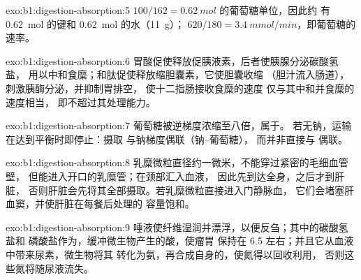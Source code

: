 \begin{solution}{exo:b1:digestion-absorption:5}
$100/162 = \qty{0.62}{mol}$ 的葡萄糖单位，因此约
有 \qty{0.62}{mol} 的键和 \qty{0.62}{mol} 的水（\qty{11}{g}）；
$620/180 = \qty{3.4}{mmol/min}$，即葡萄糖的速率。
\end{solution}

\begin{solution}{exo:b1:digestion-absorption:6}
胃酸促使释放促胰液素，后者使胰腺分泌碳酸氢盐，
用以中和食糜；和肽促使释放缩胆囊素，它使胆囊收缩
（胆汁流入肠道），刺激胰酶分泌，并抑制胃排空，
使十二指肠接收食糜的速度
仅与其中和并食糜的速度相当，
即不超过其处理能力。
\end{solution}

\begin{solution}{exo:b1:digestion-absorption:7}
葡萄糖被逆梯度浓缩至八倍，属于。
若无钠，运输在达到平衡时即停止：摄取
与钠梯度偶联（钠–葡萄糖），
而并非直接与  偶联。
\end{solution}

\begin{solution}{exo:b1:digestion-absorption:8}
乳糜微粒直径约一微米，不能穿过紧密的毛细血管壁，
但能进入开口的乳糜管；在颈部汇入血液，
因此先到达全身，之后才到肝脏，
否则肝脏会先将其全部摄取。若乳糜微粒直接进入门静脉血，
它们会堵塞肝血窦，并使肝脏在每餐后处理的
容量饱和。
\end{solution}

\begin{solution}{exo:b1:digestion-absorption:9}
唾液使纤维湿润并漂浮，以便反刍；其中的碳酸氢盐和
磷酸盐作为，缓冲微生物产生的酸，使瘤胃
保持在  6.5 左右；并且它从血液中带来尿素，微生物将其
转化为氨，再合成自身的，使氮得以回收利用，
否则这些氮将随尿液流失。
\end{solution}

